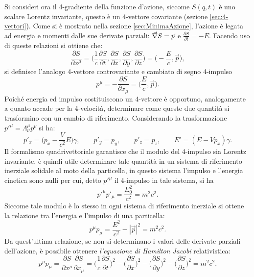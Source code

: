 Si consideri ora il 4-gradiente della funzione d'azione, siccome $S(q,t)$ è uno scalare Lorentz invariante, questo è un 4-vettore covariante (sezione \ref{sec:4-vettori}). Come si è mostrato nella sezione \ref{sec:MinimaAzione}, l'azione è legata ad energia e momenti dalle sue derivate parziali: $\vec{\nabla} S=\vec{p}$ e $\frac{\partial S }{\partial t}=-E$. Facendo uso di queste relazioni si ottiene che:
\begin{equation*}
   \frac{\partial S}{\partial x^\mu}= \bigg(\frac{1}{c}\frac{\partial S }{\partial t},\frac{\partial S }{\partial x},\frac{\partial S }{\partial y},\frac{\partial S }{\partial z}\bigg)=\bigg(-\frac{E}{c},\vec{p}\bigg),
\end{equation*}
si definisce l'analogo 4-vettore controvariante e cambiato di segno 4-impulso
\begin{equation}
    p^\mu=-\frac{\partial S }{\partial x_\mu}=\bigg(\frac{E}{c},\vec{p}\bigg).
\end{equation}
Poiché energia ed impulso costituiscono un 4-vettore è opportuno, analogamente a quanto accade per la 4-velocità, determinare come queste due quantità si trasformino con un cambio di riferimento. Considerando la trasformazione $p'^\mu=\Lambda_\nu^\mu p^\nu$ si ha:
\begin{equation}
    p'_x=\bigg(p_x-\frac{V}{c^2}E\bigg)\gamma,\qquad p'_y=p_y,\qquad p'_z=p_z,\qquad E'=(E-Vp_x)\gamma.
\end{equation}
Il formalismo quadrivettoriale garantisce che il modulo del 4-impulso sia Lorentz invariante, è quindi utile determinare tale quantità in un sistema di riferimento inerziale solidale al moto della particella, in questo sistema l'impulso e l'energia cinetica sono nulli per cui, detto $p'^\mu$ il 4-impulso in tale sistema, si ha
\begin{equation*}
    p'^\mu p'_\mu=\frac{E_0^2}{c^2}=m^2c^2.
\end{equation*}  
Siccome tale modulo è lo stesso in ogni sistema di riferimento inerziale si ottene la relazione tra l'energia e l'impulso di una particella:
\begin{equation}
    p^\mu p_\mu=\frac{E^2}{c^2}-|\vec p |^2=m^2c^2.
\end{equation}
Da quest'ultima relazione, se non si determinano i valori delle derivate parziali dell'azione, è possibile ottenere \emph{l'equazione di Hamilton Jacobi} relativistica:
\begin{equation}
    p^\mu p_\mu=\frac{\partial S }{\partial x^\mu}\frac{\partial S }{\partial x_\mu}=\bigg(\frac{1}{c}\frac{\partial S }{\partial t}\bigg)^2-\bigg(\frac{\partial S }{\partial x}\bigg)^2-\bigg(\frac{\partial S }{\partial y}\bigg)^2-\bigg(\frac{\partial S }{\partial z}\bigg)^2=m^2c^2.
\end{equation}